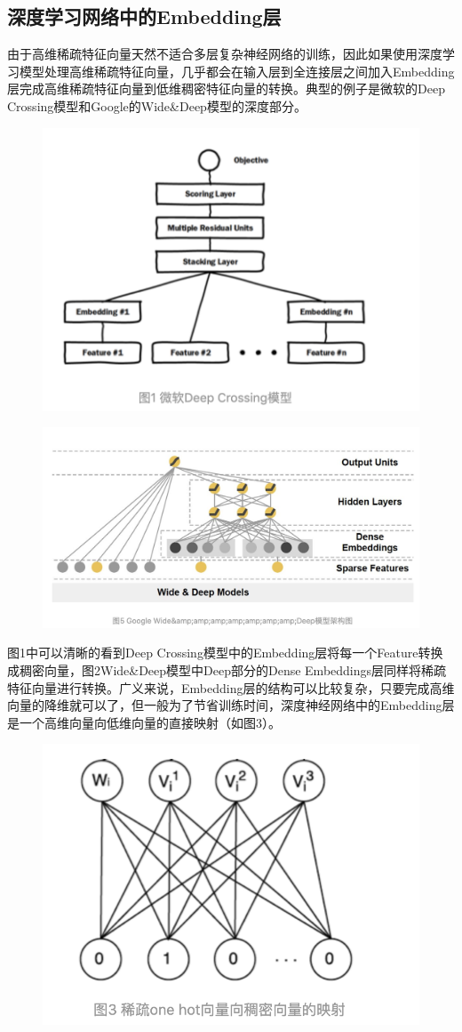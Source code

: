 \documentclass[12pt]{article}
\begin{document}
\subsection{深度学习网络中的Embedding层}
由于高维稀疏特征向量天然不适合多层复杂神经网络的训练，因此如果使用深度学习模型处理高维稀疏特征向量，几乎都会在输入层到全连接层之间加入Embedding层完成高维稀疏特征向量到低维稠密特征向量的转换。典型的例子是微软的Deep Crossing模型和Google的Wide\&Deep模型的深度部分。
\begin{figure}[H]
    \centering
    \includegraphics[width=.8\textwidth]{fig/Microsoft_Deep_Crossing_Strucure.png}
\end{figure}
\begin{figure}[H]
    \centering
    \includegraphics[width=.8\textwidth]{fig/Wide_Deep_Structure.png}
\end{figure}

图1中可以清晰的看到Deep Crossing模型中的Embedding层将每一个Feature转换成稠密向量，图2Wide\&Deep模型中Deep部分的Dense Embeddings层同样将稀疏特征向量进行转换。广义来说，Embedding层的结构可以比较复杂，只要完成高维向量的降维就可以了，但一般为了节省训练时间，深度神经网络中的Embedding层是一个高维向量向低维向量的直接映射（如图3）。
\begin{figure}[H]
    \centering
    \includegraphics[width=.5\textwidth]{fig/Embedding_From_One_Hot_Example.png}
\end{figure}
\end{document}
